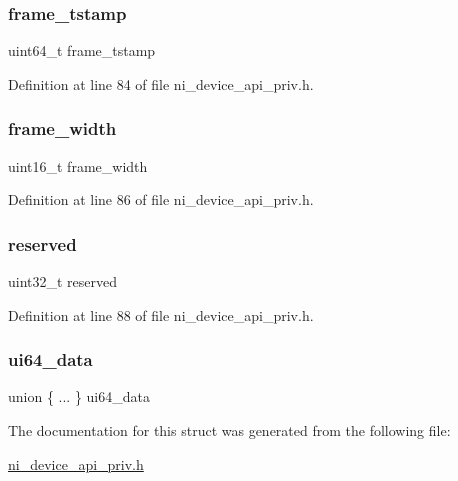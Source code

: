 \subsubsection{\texorpdfstring{frame\_tstamp}{frame\_tstamp}}
{\footnotesize\ttfamily uint64\+\_\+t frame\+\_\+tstamp}



Definition at line 84 of file ni\+\_\+device\+\_\+api\+\_\+priv.\+h.

\mbox{\label{struct__ni__decoder__metadata_a6bacf410ac8a6e1ed3030b91b6a3bd96}} 
\subsubsection{\texorpdfstring{frame\_width}{frame\_width}}
{\footnotesize\ttfamily uint16\+\_\+t frame\+\_\+width}



Definition at line 86 of file ni\+\_\+device\+\_\+api\+\_\+priv.\+h.

\mbox{\label{struct__ni__decoder__metadata_aa43c4c21b173ada1b6b7568956f0d650}} 
\subsubsection{\texorpdfstring{reserved}{reserved}}
{\footnotesize\ttfamily uint32\+\_\+t reserved}



Definition at line 88 of file ni\+\_\+device\+\_\+api\+\_\+priv.\+h.

\mbox{\label{struct__ni__decoder__metadata_a3f616afcf24860475d0e476baeb6e320}} 
\subsubsection{\texorpdfstring{ui64\_data}{ui64\_data}}
{\footnotesize\ttfamily union \{ ... \}   ui64\+\_\+data}



The documentation for this struct was generated from the following file\+:\begin{DoxyCompactItemize}
\item 
\mbox{\hyperlink{ni__device__api__priv_8h}{ni\+\_\+device\+\_\+api\+\_\+priv.\+h}}\end{DoxyCompactItemize}
